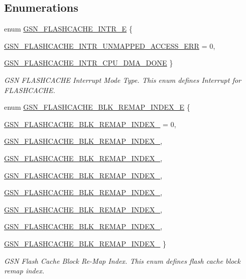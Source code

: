 \subsection*{Enumerations}
\begin{DoxyCompactItemize}
\item 
enum \hyperlink{a00646_ga758188ba46d386fb37d18abf22002f9f}{GSN\_\-FLASHCACHE\_\-INTR\_\-E} \{ \par
\hyperlink{a00646_gga758188ba46d386fb37d18abf22002f9fa7538ed6774e229b6d7fd6e6f097dd68e}{GSN\_\-FLASHCACHE\_\-INTR\_\-UNMAPPED\_\-ACCESS\_\-ERR} =  0, 
\par
\hyperlink{a00646_gga758188ba46d386fb37d18abf22002f9fabbd2a56a6ba2342a88f5658cc66ba50d}{GSN\_\-FLASHCACHE\_\-INTR\_\-CPU\_\-DMA\_\-DONE}
 \}
\begin{DoxyCompactList}\small\item\em GSN FLASHCACHE Interrupt Mode Type. This enum defines Interrupt for FLASHCACHE. \end{DoxyCompactList}\item 
enum \hyperlink{a00646_ga2fbb2a317075d9d8046e4586d991856b}{GSN\_\-FLASHCACHE\_\-BLK\_\-REMAP\_\-INDEX\_\-E} \{ \par
\hyperlink{a00646_gga2fbb2a317075d9d8046e4586d991856ba6b9536b09ca4255dd858668a57c809d8}{GSN\_\-FLASHCACHE\_\-BLK\_\-REMAP\_\-INDEX\_} =  0, 
\par
\hyperlink{a00646_gga2fbb2a317075d9d8046e4586d991856bad0ea966e72c0762fe3336e22464a40ce}{GSN\_\-FLASHCACHE\_\-BLK\_\-REMAP\_\-INDEX\_}, 
\par
\hyperlink{a00646_gga2fbb2a317075d9d8046e4586d991856bad28b96c859d35df3e557a4827031f8e7}{GSN\_\-FLASHCACHE\_\-BLK\_\-REMAP\_\-INDEX\_}, 
\par
\hyperlink{a00646_gga2fbb2a317075d9d8046e4586d991856ba634c9b4878dfb8547ebb82c2553eafe7}{GSN\_\-FLASHCACHE\_\-BLK\_\-REMAP\_\-INDEX\_}, 
\par
\hyperlink{a00646_gga2fbb2a317075d9d8046e4586d991856ba50de5128f4772952fd8881ce918349cd}{GSN\_\-FLASHCACHE\_\-BLK\_\-REMAP\_\-INDEX\_}, 
\par
\hyperlink{a00646_gga2fbb2a317075d9d8046e4586d991856baea17183b62f36d59877877f33ffd88b3}{GSN\_\-FLASHCACHE\_\-BLK\_\-REMAP\_\-INDEX\_}, 
\par
\hyperlink{a00646_gga2fbb2a317075d9d8046e4586d991856ba65bc7ca914deefef9d628a7326c0f43b}{GSN\_\-FLASHCACHE\_\-BLK\_\-REMAP\_\-INDEX\_}, 
\par
\hyperlink{a00646_gga2fbb2a317075d9d8046e4586d991856bab9d1feeea8ca5fc6d9f0c81ec463b486}{GSN\_\-FLASHCACHE\_\-BLK\_\-REMAP\_\-INDEX\_}
 \}
\begin{DoxyCompactList}\small\item\em GSN Flash Cache Block Re-\/Map Index. This enum defines flash cache block remap index. \end{DoxyCompactList}\end{DoxyCompactItemize}
